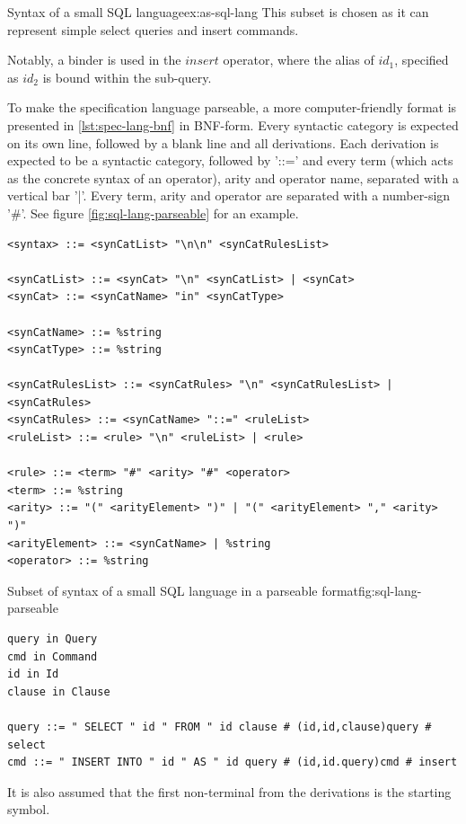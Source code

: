 \begin{example}{Syntax of a small SQL language}{ex:as-sql-lang}
  This subset is chosen as it can represent simple select queries and insert commands.

  Notably, a binder is used in the $insert$ operator, where the alias of $id_1$, specified as $id_2$ is bound within the sub-query.
\end{example}

To make the specification language parseable, a more computer-friendly format is
presented in \cref{lst:spec-lang-bnf} in BNF-form. Every syntactic category is
expected on its own line, followed by a blank line and all derivations.
Each derivation is expected to be a syntactic category, followed by '::=' and
every term (which acts as the concrete syntax of an operator), arity and operator
name, separated with a vertical bar '|'. Every term, arity and operator are separated
with a number-sign '\#'. See figure \cref{fig:sql-lang-parseable} for an example.

\begin{lstlisting}[style=inline,caption=BNF-form of the specificaiton language,label=lst:spec-lang-bnf]
<syntax> ::= <synCatList> "\n\n" <synCatRulesList>

<synCatList> ::= <synCat> "\n" <synCatList> | <synCat>
<synCat> ::= <synCatName> "in" <synCatType>

<synCatName> ::= %string
<synCatType> ::= %string

<synCatRulesList> ::= <synCatRules> "\n" <synCatRulesList> | <synCatRules>
<synCatRules> ::= <synCatName> "::=" <ruleList>
<ruleList> ::= <rule> "\n" <ruleList> | <rule>

<rule> ::= <term> "#" <arity> "#" <operator>
<term> ::= %string
<arity> ::= "(" <arityElement> ")" | "(" <arityElement> "," <arity> ")"
<arityElement> ::= <synCatName> | %string
<operator> ::= %string
\end{lstlisting}

\begin{myfigure}{Subset of syntax of a small SQL language in a parseable format}{fig:sql-lang-parseable}
  \begin{lstlisting}[style=figurestyle]
query in Query
cmd in Command
id in Id
clause in Clause

query ::= " SELECT " id " FROM " id clause # (id,id,clause)query # select
cmd ::= " INSERT INTO " id " AS " id query # (id,id.query)cmd # insert
\end{lstlisting}

  It is also assumed that the first non-terminal from the derivations is the starting symbol.

\end{myfigure}

